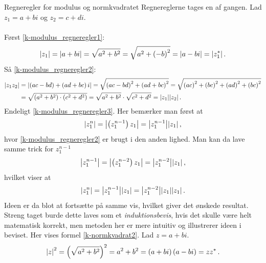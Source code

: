\begin{opgave}[2]{Regneregler for modulus og normkvadratet}
\opg Regnereglerne tages en af gangen. Lad $z_1 = a+bi$ og $z_2 = c+di$.\\ \\
Først \eqref{k-modulus_regneregler1}:
\begin{align*}
\abs{z_1} = \abs{a+bi} = \sqrt{a^2+b^2} = \sqrt{a^2+\left(-b\right)^2} = \abs{a-bi} = \abs{z_1^*} \, .
\end{align*}
Så \eqref{k-modulus_regneregler2}:
\begin{align*}
\abs{z_1z_2} &= \abs{\left(ac-bd\right) + \left(ad+bc\right)i} = \sqrt{\left(ac-bd\right)^2 + \left(ad+bc\right)^2} = \sqrt{\left(ac\right)^2 + \left(bc\right)^2 + \left(ad\right)^2 + \left(bc\right)^2} \\
&= \sqrt{\left(a^2+b^2\right) \cdot \left(c^2+d^2\right)} = \sqrt{a^2+b^2} \cdot\sqrt{c^2+d^2} = \abs{z_1}\abs{z_2} \, .  
\end{align*}
Endeligt \eqref{k-modulus_regneregler3}. Her bemærker man først at
\begin{align*}
\abs{z_1^n} = \abs{\left(z_1^{n-1}\right)z_1} = \abs{z_1^{n-1}}\abs{z_1} \, , 
\end{align*}
hvor \eqref{k-modulus_regneregler2} er brugt i  den anden lighed. Man kan da lave samme trick for $z_1^{n-1}$
\begin{align*}
\abs{z_1^{n-1}} = \abs{\left(z_1^{n-2}\right)z_1} = \abs{z_1^{n-2}}\abs{z_1} \, ,
\end{align*}  
hvilket viser at
\begin{align*}
\abs{z_1^n} = \abs{z_1^{n-1}}\abs{z_1} = \abs{z_1^{n-2}}\abs{z_1}\abs{z_1} \, .
\end{align*}
Ideen er da blot at fortsætte på samme vis, hvilket giver det ønskede resultat. Streng taget burde dette laves som et \emph{induktionsbevis}, hvis det skulle være helt matematisk korrekt, men metoden her er mere intuitiv og illustrerer ideen i beviset.
\opg Her vises formel \eqref{k-normkvadrat2}. Lad $z=a+bi$.
\begin{align*}
\abs{z}^2 = \left(\sqrt{a^2+b^2}\right)^2 = a^2+b^2 = \left(a+bi\right)\left(a-bi\right) = zz^* \, .
\end{align*}
\end{opgave}
